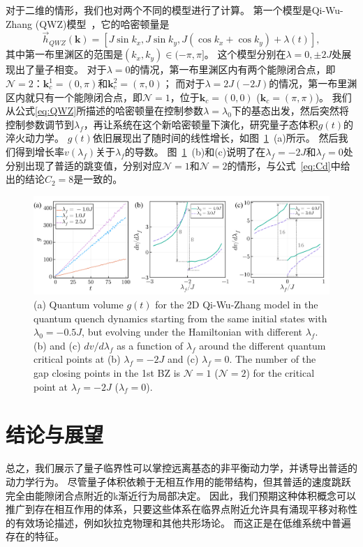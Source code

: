 			对于二维的情形，我们也对两个不同的模型进行了计算。
			第一个模型是Qi-Wu-Zhang (QWZ)模型~\cite{Qi2006}，它的哈密顿量是
			\begin{equation}
				\vec{h}_{QWZ}(\mathbf{k}) = [J\sin k_x, J\sin k_y, J(\cos k_x + \cos k_y) + \lambda(t)],\label{eq:QWZ}
			\end{equation}
			其中第一布里渊区的范围是$(k_x, k_y) \in (-\pi, \pi]$。
			这个模型分别在$\lambda = 0, \pm2J$处展现出了量子相变。
			对于$\lambda = 0$的情况，第一布里渊区内有两个能隙闭合点，即$\mathcal{N}=2$：$\mathbf{k}_c^1=(0,\pi)$和$\mathbf{k}_c^2=(\pi,0)$；
			而对于$\lambda = 2J(-2J)$的情况，第一布里渊区内就只有一个能隙闭合点，即$\mathcal{N}=1$，位于$\mathbf{k}_c=(0,0)$ ($\mathbf{k}_c=(\pi,\pi)$)。
			我们从公式\eqref{eq:QWZ}所描述的哈密顿量在控制参数$\lambda = \lambda_0$下的基态出发，然后突然将控制参数调节到$\lambda_f$，再让系统在这个新哈密顿量下演化，研究量子态体积$g(t)$的淬火动力学。
			$g(t)$依旧展现出了随时间的线性增长，如图~\ref{Fig:QV_2D_QWZ}~(a)所示。
			然后我们得到增长率$v(\lambda_f)$关于$\lambda_f$的导数。
			图~\ref{Fig:QV_2D_QWZ}~(b)和(c)说明了在$\lambda_f=-2J$和$\lambda_f=0$处分别出现了普适的跳变值，分别对应$\mathcal{N}=1$和$\mathcal{N}=2$的情形，与公式~\eqref{eq:Cd}中给出的结论$C_2 = 8$是一致的。
			
			\begin{figure}[!htp]
				\centering
				\includegraphics[width=1\textwidth]{figures/QV_2D_QWZ.pdf}
				\centering
				{(a) Quantum volume $g(t)$ for the 2D Qi-Wu-Zhang model in the quantum quench dynamics starting from the same initial states with $\lambda_0=-0.5J$, but evolving under the Hamiltonian with different $\lambda_f$.
					(b) and (c) $dv/d\lambda_f$ as a function of $\lambda_f$ around the different quantum critical points at (b) $\lambda_f=-2J$ and (c) $\lambda_f=0$.  The number of the gap closing points in the 1st BZ is $\mathcal{N}=1$ ($\mathcal{N}=2$) for the critical point at $\lambda_f=-2J$ ($\lambda_f=0$).}
				\label{Fig:QV_2D_QWZ}
			\end{figure}
		
	\section{结论与展望}
		总之，我们展示了量子临界性可以掌控远离基态的非平衡动力学，并诱导出普适的动力学行为。
		尽管量子体积依赖于无相互作用的能带结构，但其普适的速度跳跃完全由能隙闭合点附近的k渐近行为局部决定。
		因此，我们预期这种体积概念可以推广到存在相互作用的体系\cite{Souza2000}，只要这些体系在临界点附近允许具有涌现平移对称性的有效场论描述，例如狄拉克物理和其他共形场论\cite{Francesco:2012aa,Wehling:2014aa}。
		而这正是在低维系统中普遍存在的特征\cite{Gogolin:2004aa}。
	
	
	